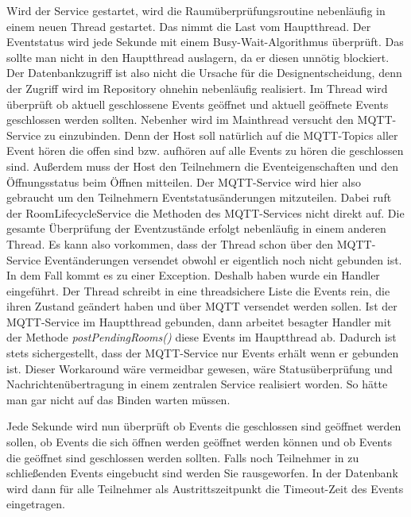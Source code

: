 Wird der Service gestartet, wird die Raumüberprüfungsroutine nebenläufig in einem neuen Thread gestartet. Das nimmt die Last vom Hauptthread.
Der Eventstatus wird jede Sekunde mit einem Busy-Wait-Algorithmus überprüft.
Das sollte man nicht in den Hauptthread auslagern, da er diesen unnötig blockiert. 
Der Datenbankzugriff ist also nicht die Ursache für die Designentscheidung, denn der Zugriff wird im Repository ohnehin nebenläufig realisiert.
Im Thread wird überprüft ob aktuell geschlossene Events geöffnet und aktuell geöffnete Events geschlossen werden sollten.
Nebenher wird im Mainthread versucht den MQTT-Service zu einzubinden. 
Denn der Host soll natürlich auf die MQTT-Topics aller Event hören die offen sind bzw. aufhören auf alle Events zu hören die geschlossen sind.
Außerdem muss der Host den Teilnehmern die Eventeigenschaften und den Öffnungsstatus beim Öffnen mitteilen. 
Der MQTT-Service wird hier also gebraucht um den Teilnehmern Eventstatusänderungen mitzuteilen.
Dabei ruft der RoomLifecycleService die Methoden des MQTT-Services nicht direkt auf. Die gesamte Überprüfung der Eventzustände erfolgt nebenläufig in einem anderen Thread. 
Es kann also vorkommen, dass der Thread schon über den MQTT-Service Eventänderungen versendet obwohl er eigentlich noch nicht gebunden ist. 
In dem Fall kommt es zu einer Exception.
Deshalb haben wurde ein Handler eingeführt. Der Thread schreibt in eine threadsichere Liste die Events rein, die ihren Zustand geändert haben und über MQTT versendet werden sollen. 
Ist der MQTT-Service im Hauptthread gebunden, dann arbeitet besagter Handler mit der Methode \textit{postPendingRooms()} diese Events im Hauptthread ab. 
Dadurch ist stets sichergestellt, dass der MQTT-Service nur Events erhält wenn er gebunden ist. 
Dieser Workaround wäre vermeidbar gewesen, wäre Statusüberprüfung und Nachrichtenübertragung in einem zentralen Service realisiert worden. So hätte man gar nicht auf das Binden warten müssen.

Jede Sekunde wird nun überprüft ob Events die geschlossen sind geöffnet werden sollen, ob Events die sich öffnen werden geöffnet werden können und ob Events die geöffnet sind geschlossen werden sollten. 
Falls noch Teilnehmer in zu schließenden Events eingebucht sind werden Sie rausgeworfen. In der Datenbank wird dann für alle Teilnehmer als Austrittszeitpunkt die Timeout-Zeit des Events eingetragen.



